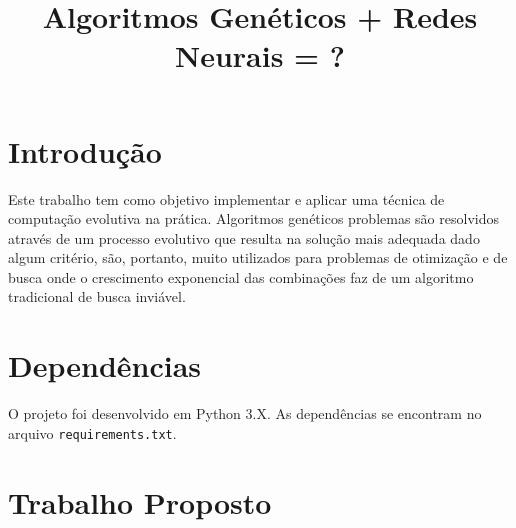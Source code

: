 \documentclass[twoside,conference,a4paper]{IEEEtran}
\begin{document}
\renewcommand{\IEEEkeywordsname}{Palavras-chave}


\title{Algoritmos Genéticos + Redes Neurais = ?}
\author{%
}


\maketitle


\section{Introdução}

Este trabalho tem como objetivo implementar e aplicar uma técnica de computação evolutiva na prática.
Algoritmos genéticos problemas são resolvidos através de um processo evolutivo que resulta na solução mais adequada dado algum critério, são, portanto, muito utilizados para problemas de otimização e de busca onde o crescimento exponencial das combinações faz de um algoritmo tradicional de busca inviável.

\section{Dependências}

O projeto foi desenvolvido em Python 3.X. As dependências se encontram no arquivo \texttt{requirements.txt}.

\section{Trabalho Proposto}
\end{document}
